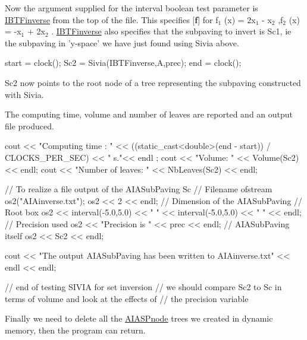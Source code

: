 \-Now the argument supplied for the interval boolean test parameter is \hyperlink{AIASubPavings_IBTFinverse}{\-I\-B\-T\-Finverse} from the top of the file. \-This specifies \mbox{[}{\bfseries f}\mbox{]} for f$_{\mbox{1}}$ (x) = 2x$_{\mbox{1}}$  -\/ x$_{\mbox{2}}$ ,f$_{\mbox{2}}$ (x) = -\/x$_{\mbox{1}}$  + 2x$_{\mbox{2}}$ . \hyperlink{AIASubPavings_IBTFinverse}{\-I\-B\-T\-Finverse} also specifies that the subpaving to invert is \-Sc1, ie the subpaving in 'y-\/space' we have just found using \-Sivia above.


\begin{DoxyCodeInclude}
  start = clock();
  Sc2 = Sivia(IBTFinverse,A,prec);
  end = clock();

\end{DoxyCodeInclude}


\-Sc2 now points to the root node of a tree representing the subpaving constructed with \-Sivia.

\-The computing time, volume and number of leaves are reported and an output file produced.


\begin{DoxyCodeInclude}
  cout << "Computing time : " 
       << ((static_cast<double>(end - start)) / CLOCKS_PER_SEC) << " s."<< endl
      ;
  cout << "Volume: " << Volume(Sc2) << endl;
  cout << "Number of leaves: " << NbLeaves(Sc2) << endl;

  // To realize a file output of the AIASubPaving Sc
                    // Filename
  ofstream os2("AIAinverse.txt");
  os2 << 2 << endl; // Dimension of the AIASubPaving
                    // Root box
  os2 << interval(-5.0,5.0) << " "
    << interval(-5.0,5.0) << " " << endl;
                    // Precision used
  os2 << "Precision is " << prec << endl;
                    // AIASubPaving itself
  os2 << Sc2 << endl;

  cout << "The output AIASubPaving has been written to AIAinverse.txt" 
       << endl << endl;

  // end of testing SIVIA for set inversion
  // we should compare Sc2 to Sc in terms of volume and look at the effects of 
  // the precision variable

\end{DoxyCodeInclude}


\-Finally we need to delete all the \hyperlink{classAIASPnode}{\-A\-I\-A\-S\-Pnode} trees we created in dynamic memory, then the program can return.


\begin{DoxyCodeInclude}
  delete A;         // delete subpavings newed in dyamic memory
  delete Sc;
  delete Sc1;
  delete Sc2;

  return 0;
}

\end{DoxyCodeInclude}


